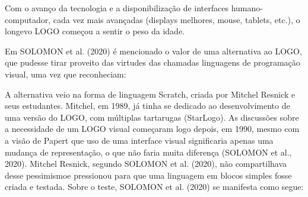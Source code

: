 \documentclass[
12pt,		%
openright,	%
twoside,  %
a4paper,			%
chapter=TITLE,		%
english,			%
french,				%
spanish,			%
brazil				%
]{USPSC-classe/USPSC}
\begin{document}
Com o avan\c{c}o da tecnologia e a disponibiliza\c{c}\~ao de interfaces humano-computador, cada vez mais avan\c{c}adas (displays melhores, mouse, tablets, etc.), o longevo LOGO come\c{c}ou a sentir o peso da idade.








Em SOLOMON et al. (2020) \'e mencionado o valor de uma alternativa ao LOGO, que pudesse tirar proveito das virtudes das chamadas \textquotedbl linguagens de programa\c{c}\~ao visual\textquotedbl , uma vez que reconheciam:









\noindent\begin{center}\mbox{\centering{}}\end{center}


A alternativa veio na forma de linguagem Scratch, criada por Mitchel Resnick e seus estudantes. Mitchel, em 1989, j\'a tinha se dedicado ao desenvolvimento de uma vers\~ao do LOGO, com m\'ultiplas tartarugas (StarLogo). As discuss\~oes sobre a necessidade de um  LOGO visual come\c{c}aram logo depois, em 1990, mesmo com a vis\~ao de Papert que uso de uma interface visual significaria apenas uma mudan\c{c}a de representa\c{c}\~ao, o que n\~ao faria muita diferen\c{c}a   (SOLOMON et al., 2020). Mitchel Resnick, segundo  SOLOMON et al. (2020), \textquotedbl n\~ao compartilhava desse pessimismo\textquotedbl  e pressionou para que uma linguagem em blocos simples fosse criada e testada. Sobre o teste,  SOLOMON et al. (2020) se manifesta como segue:









\noindent\begin{center}\mbox{\centering{}}\end{center}
\end{document}
